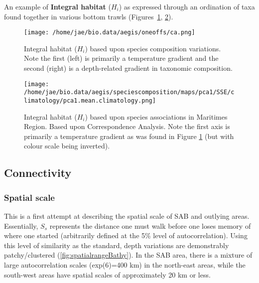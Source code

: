 \documentclass[letterpaper,portrait,11pt]{scrartcl}
\numberwithin{equation}{section}    %
\numberwithin{figure}{section}    %
\numberwithin{table}{section}       %
\begin{document}
An example of \textbf{Integral habitat}  ($H_i$) as expressed through an ordination of taxa found together in various bottom trawls (Figures~\ref{fig:speciesCompostionMap}, \ref{fig:speciesCompostionMapPCA}).

\begin{figure}[h]
  \label{fig:speciesCompostionMap}
  \centering
  \texttt{[image: /home/jae/bio.data/aegis/oneoffs/ca.png]}
  \caption{Integral habitat  ($H_i$) based upon species composition variations. Note the first (left) is primarily a temperature gradient and the second (right) is a depth-related gradient in taxonomic composition.}
\end{figure}


\begin{figure}[h]
  \centering
  \texttt{[image: /home/jae/bio.data/aegis/speciescomposition/maps/pca1/SSE/climatology/pca1.mean.climatology.png]}
  \caption{Integral habitat ($H_i$) based upon species associations in Maritimes Region. Based upon Correspondence Analysis. Note the first axis is primarily a temperature gradient as was found in Figure \ref{fig:speciesCompostionMap} (but with colour scale being inverted).}
  \label{fig:speciesCompostionMapPCA}
\end{figure}


\afterpage{\clearpage}
\subsection{Connectivity}

\subsubsection{Spatial scale}

This is a first attempt at describing the spatial scale of SAB and outlying areas. Essentially, $S_s$ represents the distance one must walk before one loses memory of where one started (arbitrarily defined at the 5\% level of autocorrelation). Using this level of similarity as the standard, depth variations are demonstrably patchy/clustered  (\ref{fig:spatialrangeBathy}). In the SAB area, there is a mixture of large autocorrelation scales (exp(6)=400 km)  in the north-east areas, while the south-west areas have spatial scales of approximately 20 km or less.

\clearpage
\end{document}
